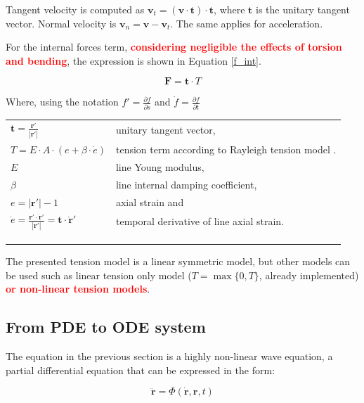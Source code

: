 \documentclass[10pt] {article}
\newcommand{\pa}{\partial}
\begin{document}
Tangent velocity is computed as $\mathbf{v}_t = (\mathbf{v}\cdot\mathbf{t})\cdot\mathbf{t}$, where $\mathbf{t}$ is the unitary tangent vector. Normal velocity is $\mathbf{v}_n = \mathbf{v}-\mathbf{v}_t$. The same applies for acceleration.

For the internal forces term, \textbf{\textcolor{Red}{considering negligible the effects of torsion and bending}}, the expression is shown in Equation \ref{f_int}.

\begin{equation}
\mathbf{F} = \mathbf{t}\cdot T \label{f_int}    
\end{equation}

Where, using the notation $f' = \frac{\pa f}{\pa s}$ and $\dot{f} = \frac{\pa f}{\pa t}$\\

\begin{tabular}{ll}
$\mathbf{t} = \frac{\mathbf{r}'}{|\mathbf{r}'|}$  & unitary tangent vector, \\
$T = E\cdot A\cdot (e + \beta\cdot \dot{e})$ & tension term according to Rayleigh tension model \cite{azcona}.\\
$E$ & line Young modulus, \\
$\beta$ & line internal damping coefficient, \\
$e = |\mathbf{r}'| - 1$ & axial strain and\\
$\dot{e} = \frac{\mathbf{r}'\cdot\dot{\mathbf{r}}'}{|\mathbf{r}'|} = \mathbf{t}\cdot\dot{\mathbf{r}}'$ & temporal derivative of line axial strain. \\ \\ \\ \\
\end{tabular}

The presented tension model is a linear symmetric model, but other models can be used such as linear tension only model ($T=\max \{0,T\}$, already implemented) \textbf{\textcolor{Red}{or non-linear tension models}}. \\

\subsection{From PDE to ODE system}

The equation in the previous section is a highly non-linear wave equation, a partial differential equation that can be expressed in the form:

$$\ddot{\mathbf{r}} = \Phi(\dot{\mathbf{r}},\mathbf{r},t)$$
\end{document}
